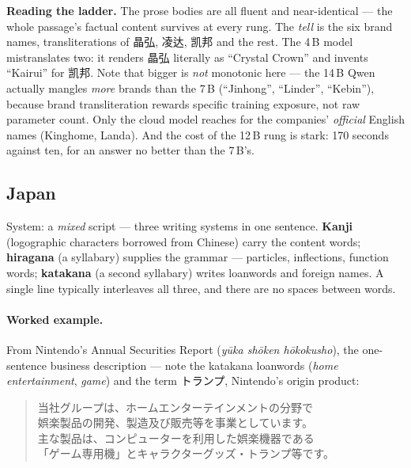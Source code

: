 \documentclass[11pt,a4paper]{report}
\newcommand{\cncjk}[2]{{\cjkCNfont #1}}
\begin{document}
\noindent \textbf{Reading the ladder.} The prose bodies are all fluent and near-identical --- the whole
passage's factual content survives at every rung. The \emph{tell} is the six brand names, transliterations
of \cncjk{晶弘}{}, \cncjk{凌达}{}, \cncjk{凯邦}{} and the rest. The 4\,B model mistranslates two: it renders
\cncjk{晶弘}{} literally as ``Crystal Crown'' and invents ``Kairui'' for \cncjk{凯邦}{}. Note that bigger is
\emph{not} monotonic here --- the 14\,B Qwen actually mangles \emph{more} brands than the 7\,B (``Jinhong'',
``Linder'', ``Kebin''), because brand transliteration rewards specific training exposure, not raw parameter
count. Only the cloud model reaches for the companies' \emph{official} English names (Kinghome, Landa). And
the cost of the 12\,B rung is stark: 170 seconds against ten, for an answer no better than the 7\,B's.

\subsection{Japan}
System: a \emph{mixed} script --- three writing systems in one sentence. \textbf{Kanji} (logographic
characters borrowed from Chinese) carry the content words; \textbf{hiragana} (a syllabary) supplies the
grammar --- particles, inflections, function words; \textbf{katakana} (a second syllabary) writes loanwords
and foreign names. A single line typically interleaves all three, and there are no spaces between words.

\paragraph{Worked example.} From Nintendo's Annual Securities Report (\emph{yūka shōken hōkokusho}), the
one-sentence business description --- note the katakana loanwords (\emph{home entertainment}, \emph{game})
and the term \cncjk{トランプ}{}, Nintendo's origin product:
\begin{quote}
{\cjkJPfont 当社グループは、ホームエンターテインメントの分野で\\
娯楽製品の開発、製造及び販売等を事業としています。\\
主な製品は、コンピューターを利用した娯楽機器である\\
「ゲーム専用機」とキャラクターグッズ・トランプ等です。}
\end{quote}
\end{document}
